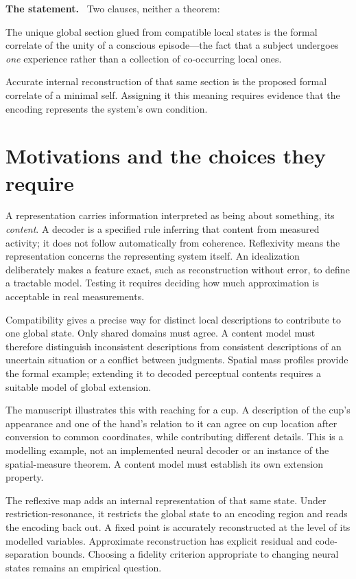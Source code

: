 \documentclass[11pt]{article}
\newcommand{\statement}{\par\smallskip\noindent\textbf{The statement.}\ }
\begin{document}
\statement
Two clauses, neither a theorem:
\begin{description}[leftmargin=*,style=nextline]
\item[Unity.] The unique global section glued from compatible local states is
the formal correlate of the unity of a conscious episode---the fact that a
subject undergoes \emph{one} experience rather than a collection of
co-occurring local ones.
\item[Selfhood.] Accurate internal reconstruction of that same section is
the proposed formal correlate of a minimal self. Assigning it this meaning
requires evidence that the encoding represents the system's own condition.
\end{description}

\section{Motivations and the choices they require}

A representation carries information interpreted as being about something,
its \emph{content}. A decoder is a specified rule inferring that content
from measured activity; it does not follow automatically from coherence.
Reflexivity means the representation concerns the representing system itself.
An idealization deliberately makes a feature exact, such as reconstruction
without error, to define a tractable model. Testing it requires deciding how
much approximation is acceptable in real measurements.

Compatibility gives a precise way for distinct local descriptions to contribute
to one global state. Only shared domains must agree. A content model must
therefore distinguish inconsistent descriptions from consistent descriptions
of an uncertain situation or a conflict between judgments. Spatial mass
profiles provide the formal example; extending it to decoded perceptual
contents requires a suitable model of global extension.

The manuscript illustrates this with reaching for a cup. A description of
the cup's appearance and one of the hand's relation to it can agree on cup
location after conversion to common coordinates, while contributing different
details. This is a modelling example, not an implemented neural decoder or an
instance of the spatial-measure theorem. A content model must establish its
own extension property.

The reflexive map adds an internal representation of that same state. Under
restriction-resonance, it restricts the global state to an encoding region and
reads the encoding back out. A fixed point is accurately reconstructed at the
level of its modelled variables. Approximate reconstruction has explicit
residual and code-separation bounds. Choosing a fidelity criterion appropriate
to changing neural states remains an empirical question.
\end{document}
